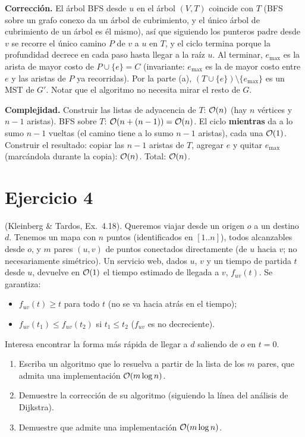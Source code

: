 \textbf{Corrección.} El árbol BFS desde $u$ en el árbol $(V,T)$ coincide con $T$ (BFS sobre un grafo conexo da un árbol de cubrimiento, y el único árbol de cubrimiento de un árbol es él mismo), así que siguiendo los punteros $\mathrm{padre}$ desde $v$ se recorre el único camino $P$ de $v$ a $u$ en $T$, y el ciclo termina porque la profundidad decrece en cada paso hasta llegar a la raíz $u$. Al terminar, $e_{\max}$ es la arista de mayor costo de $P\cup\{e\}=C$ (invariante: $e_{\max}$ es la de mayor costo entre $e$ y las aristas de $P$ ya recorridas). Por la parte (a), $(T\cup\{e\})\setminus\{e_{\max}\}$ es un MST de $G'$. Notar que el algoritmo no necesita mirar el resto de $G$.

\textbf{Complejidad.} Construir las listas de adyacencia de $T$: $\mathcal{O}(n)$ (hay $n$ vértices y $n-1$ aristas). BFS sobre $T$: $\mathcal{O}(n+(n-1))=\mathcal{O}(n)$. El ciclo \textbf{mientras} da a lo sumo $n-1$ vueltas (el camino tiene a lo sumo $n-1$ aristas), cada una $\mathcal{O}(1)$. Construir el resultado: copiar las $n-1$ aristas de $T$, agregar $e$ y quitar $e_{\max}$ (marcándola durante la copia): $\mathcal{O}(n)$. Total: $\mathcal{O}(n)$.

\section{Ejercicio 4}
\begin{enunciado}
(Kleinberg \& Tardos, Ex.~4.18). Queremos viajar desde un origen $o$ a un destino $d$. Tenemos un mapa con $n$ puntos (identificados en $[1..n]$), todos alcanzables desde $o$, y $m$ pares $(u,v)$ de puntos conectados directamente (de $u$ hacia $v$; no necesariamente simétrico). Un servicio web, dados $u$, $v$ y un tiempo de partida $t$ desde $u$, devuelve en $\mathcal{O}(1)$ el tiempo estimado de llegada a $v$, $f_{uv}(t)$. Se garantiza:
\begin{itemize}
\item $f_{uv}(t)\ge t$ para todo $t$ (no se va hacia atrás en el tiempo);
\item $f_{uv}(t_1)\le f_{uv}(t_2)$ si $t_1\le t_2$ ($f_{uv}$ es no decreciente).
\end{itemize}
Interesa encontrar la forma más rápida de llegar a $d$ saliendo de $o$ en $t=0$.
\begin{enumerate}[label=(\alph*)]
\item Escriba un algoritmo que lo resuelva a partir de la lista de los $m$ pares, que admita una implementación $\mathcal{O}(m\log n)$.
\item Demuestre la corrección de su algoritmo (siguiendo la línea del análisis de Dijkstra).
\item Demuestre que admite una implementación $\mathcal{O}(m\log n)$.
\end{enumerate}
\end{enunciado}

